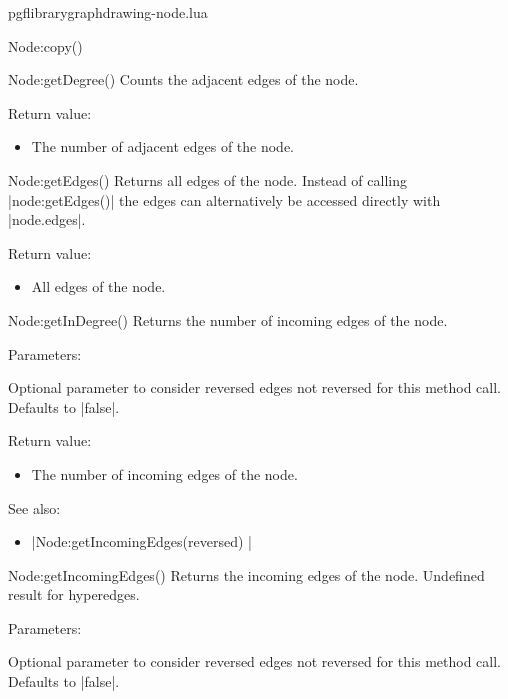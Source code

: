 \begin{filedescription}{pgflibrarygraphdrawing-node.lua}
\begin{luacommand}{{Node:copy}()}
\end{luacommand}\begin{luacommand}{{Node:getDegree}()}
Counts the adjacent edges of the node. 


Return value:
\begin{itemize} \item[] The number of adjacent edges of the node.  \end{itemize}


\end{luacommand}\begin{luacommand}{{Node:getEdges}()}
Returns all edges of the node.  Instead of calling |node:getEdges()| the edges can alternatively be accessed directly with |node.edges|. 


Return value:
\begin{itemize} \item[] All edges of the node.  \end{itemize}


\end{luacommand}\begin{luacommand}{{Node:getInDegree}()}
Returns the number of incoming edges of the node. 

Parameters:
\begin{parameterdescription}
	\item[\meta{ignorereversed}] Optional parameter to consider reversed edges not reversed for this method call. Defaults to |false|. 
\end{parameterdescription}


Return value:
\begin{itemize} \item[] The number of incoming edges of the node.  \end{itemize}


See also:
\begin{itemize}
	\item[] |Node:getIncomingEdges(reversed) |
\end{itemize}

\end{luacommand}\begin{luacommand}{{Node:getIncomingEdges}()}
Returns the incoming edges of the node. Undefined result for hyperedges. 

Parameters:
\begin{parameterdescription}
	\item[\meta{ignorereversed}] Optional parameter to consider reversed edges not reversed for this method call. Defaults to |false|. 
\end{parameterdescription}



\end{luacommand}
\end{filedescription}
